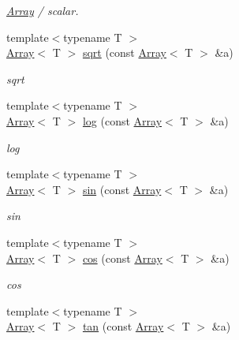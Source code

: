 \begin{DoxyCompactItemize}
\begin{DoxyCompactList}\small\item\em \mbox{\hyperlink{classXMLArray_1_1Array}{Array}} / scalar. \end{DoxyCompactList}\item 
{\footnotesize template$<$typename T $>$ }\\\mbox{\hyperlink{classXMLArray_1_1Array}{Array}}$<$ T $>$ \mbox{\hyperlink{namespaceXMLArray_a6b3f8ee1d76ecaf106e799ed6278b303}{sqrt}} (const \mbox{\hyperlink{classXMLArray_1_1Array}{Array}}$<$ T $>$ \&a)
\begin{DoxyCompactList}\small\item\em sqrt \end{DoxyCompactList}\item 
{\footnotesize template$<$typename T $>$ }\\\mbox{\hyperlink{classXMLArray_1_1Array}{Array}}$<$ T $>$ \mbox{\hyperlink{namespaceXMLArray_adea4803e894b23debf6555f41722fc8a}{log}} (const \mbox{\hyperlink{classXMLArray_1_1Array}{Array}}$<$ T $>$ \&a)
\begin{DoxyCompactList}\small\item\em log \end{DoxyCompactList}\item 
{\footnotesize template$<$typename T $>$ }\\\mbox{\hyperlink{classXMLArray_1_1Array}{Array}}$<$ T $>$ \mbox{\hyperlink{namespaceXMLArray_a2d0e4bcea1d1d685dc5ba46bba31ff5b}{sin}} (const \mbox{\hyperlink{classXMLArray_1_1Array}{Array}}$<$ T $>$ \&a)
\begin{DoxyCompactList}\small\item\em sin \end{DoxyCompactList}\item 
{\footnotesize template$<$typename T $>$ }\\\mbox{\hyperlink{classXMLArray_1_1Array}{Array}}$<$ T $>$ \mbox{\hyperlink{namespaceXMLArray_afae227c9b7f0e447f5e058acd82cc580}{cos}} (const \mbox{\hyperlink{classXMLArray_1_1Array}{Array}}$<$ T $>$ \&a)
\begin{DoxyCompactList}\small\item\em cos \end{DoxyCompactList}\item 
{\footnotesize template$<$typename T $>$ }\\\mbox{\hyperlink{classXMLArray_1_1Array}{Array}}$<$ T $>$ \mbox{\hyperlink{namespaceXMLArray_a2683239081c39ed11300a85ee984a25d}{tan}} (const \mbox{\hyperlink{classXMLArray_1_1Array}{Array}}$<$ T $>$ \&a)

\end{DoxyCompactItemize}
